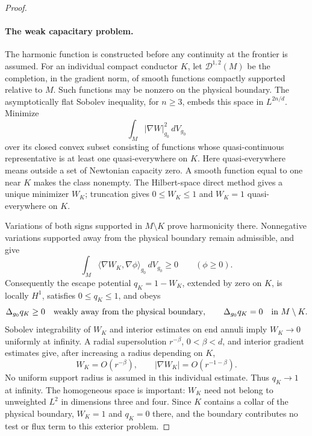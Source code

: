 \begin{proof}
\paragraph{The weak capacitary problem.}
The harmonic function is constructed before any continuity at the
frontier is assumed. For an individual compact conductor $K$, let
$\mathcal D^{1,2}(M)$ be the completion, in the gradient norm, of
smooth functions compactly supported relative to $M$. Such
functions may be nonzero on the physical boundary. The
asymptotically flat Sobolev inequality, for $n\ge3$, embeds this
space in $L^{2n/d}$. Minimize
\[
 \int_M|\nabla W|_{g_0}^2\,dV_{g_0}
\]
over its closed convex subset consisting of functions whose
quasi-continuous representative is at least one quasi-everywhere
on $K$. Here quasi-everywhere means outside a set of Newtonian
capacity zero. A smooth function equal to one near $K$ makes the
class nonempty. The Hilbert-space direct method gives a unique
minimizer $W_K$; truncation gives $0\le W_K\le1$ and $W_K=1$
quasi-everywhere on $K$.

Variations of both signs supported in $M\setminus K$ prove
harmonicity there. Nonnegative variations supported away from
the physical boundary remain admissible, and give
\[
 \int_M\langle\nabla W_K,\nabla\phi\rangle_{g_0}\,dV_{g_0}
 \ge0\qquad(\phi\ge0).
\]
Consequently the escape potential $q_K=1-W_K$, extended by zero
on $K$, is locally $H^1$, satisfies $0\le q_K\le1$, and obeys
\begin{equation}
\label{eq:rpi:flow-weak-potential}
 \Delta_{g_0}q_K\ge0\quad\hbox{weakly away from the physical boundary},
 \qquad \Delta_{g_0}q_K=0\quad\hbox{in }M\setminus K.
\end{equation}
Sobolev integrability of $W_K$ and interior estimates on end
annuli imply $W_K\to0$ uniformly at infinity. A radial
supersolution $r^{-\beta}$, $0<\beta<d$, and interior gradient
estimates give, after increasing a radius depending on $K$,
\[
 W_K=O(r^{-\beta}),\qquad |\nabla W_K|=O(r^{-1-\beta}).
\]
No uniform support radius is assumed in this individual estimate.
Thus $q_K\to1$ at infinity. The homogeneous space is important:
$W_K$ need not belong to unweighted $L^2$ in dimensions three
and four. Since $K$ contains a collar of the physical boundary,
$W_K=1$ and $q_K=0$ there, and the boundary contributes no test
or flux term to this exterior problem.


\end{proof}
